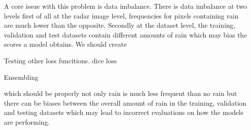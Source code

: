 A core issue with this problem is data imbalance. There is data imbalance at two levels
first of all at the radar image level, frequencies for pixels containing rain are much lower than the opposite.
Secondly at the dataset level, the training, validation and test datasets contain different amounts of rain
which may bias the scores a model obtains. We should create

Testing other loss funcitions. dice loss


Ensembling


which should be properly not only rain is much less frequent than no rain but
there can be biases between the overall amount of rain in the training, validation and testing datasets which may lead to
incorrect evaluations on how the models are performing.